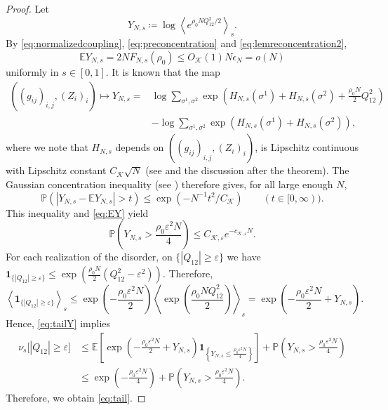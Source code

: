 \documentclass[11pt]{article}
\numberwithin{equation}{section}
\newcommand{\E}{\mathbb{E}}
\newcommand{\1}{\mathbf 1}
\newcommand{\cK}{\mathcal K}
\newcommand{\braket}[1]{\left\langle #1\right\rangle}
\begin{document}
\begin{proof}
Let
\[
 Y_{N,s}
 \coloneqq\log\braket{e^{\rho_0NQ_{12}^2/2}}_s.
\]
By \eqref{eq:normalizedcoupling}, \eqref{eq:preconcentration} and \eqref{eq:lemreconcentration2},
\begin{equation}\label{eq:EY}
 \E Y_{N,s}=2NF_{N,s}(\rho_0)
 \le O_{\cK}(1)N\epsilon_N=o(N)
\end{equation}
uniformly in $s\in [0,1]$.
It is known that the map
\begin{align*}
((g_{ij})_{i,j}, (Z_i)_{i}) \mapsto Y_{N,s} = & \log
 \sum_{\sigma^1,\sigma^2}
 \exp\left(
 H_{N,s}(\sigma^1)+H_{N,s}(\sigma^2)
 +\frac{\rho _0 N}{2}Q_{12}^2\right) \\
&- \log
 \sum_{\sigma^1,\sigma^2}
 \exp\left(
 H_{N,s}(\sigma^1)+H_{N,s}(\sigma^2)
 \right) ,
\end{align*}
where we note that $H_{N,s}$ depends on $((g_{ij})_{i,j}, (Z_i)_{i})$, is Lipschitz continuous with Lipschitz constant $C_{\cK}\sqrt{N}$
(see \cite[Theorem~1.3.5]{Talagrand} and the discussion after the theorem).
The Gaussian concentration inequality
(see \cite[Theorem~1.3.4]{Talagrand})
therefore gives, for all
large enough $N$,
\[
 \mathbb P\left(
 |Y_{N,s} - \mathbb E Y_{N,s}|> t \right)
\le \exp \left( - N^{-1 } t^2/C_{\cK}  \right) \qquad (t\in [0,\infty )).
\]
This inequality and \eqref{eq:EY} yield
\begin{equation}\label{eq:tailY}
\mathbb P\left(
 Y_{N,s}>\frac{\rho_0\varepsilon^2N}{4}\right) \le C_{\cK,\varepsilon}e^{-c_{\cK,\varepsilon}N}.
\end{equation}
For each realization of the disorder, on $\{|Q_{12}|\ge\varepsilon\}$ we have
\(
\1_{\{|Q_{12}|\ge\varepsilon\}}
\le
\exp\left(
\frac{\rho_0N}{2}(Q_{12}^2-\varepsilon^2)
\right).
\) 
Therefore,
\[
\left\langle \1_{\{|Q_{12}|\ge\varepsilon\}}\right\rangle_s
\le
\exp\left(-\frac{\rho_0\varepsilon^2N}{2}\right)
\left\langle
\exp\left(\frac{\rho_0NQ_{12}^2}{2}\right)
\right\rangle_s
=
\exp\left(
-\frac{\rho_0\varepsilon^2N}{2}+Y_{N,s}
\right).
\]
Hence, 
\eqref{eq:tailY} implies
\begin{align*}
\nu_s\bigl[|Q_{12}|\ge\varepsilon\bigr]
&\le
\E\left[
\exp\left(
-\frac{\rho_0\varepsilon^2N}{2}+Y_{N,s}
\right)
\1_{\left\{Y_{N,s}\le \frac{\rho_0\varepsilon^2N}{4}\right\}}
\right]
+
\mathbb P\left(
Y_{N,s}>\frac{\rho_0\varepsilon^2N}{4}
\right)
\\
&\le
\exp\left(-\frac{\rho_0\varepsilon^2N}{4}\right)
+
\mathbb P\left(
Y_{N,s}>\frac{\rho_0\varepsilon^2N}{4}
\right).
\end{align*}
Therefore, we obtain \eqref{eq:tail}.
\end{proof}
\end{document}
